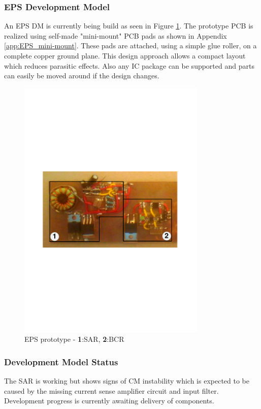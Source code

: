 \subsubsection{EPS Development Model}
An \ac{EPS} \ac{DM} is currently being build as seen in Figure \ref{fig:EPSprototype}. The prototype \ac{PCB} is realized using self-made "mini-mount" \ac{PCB} pads as shown in Appendix \ref{app:EPS_mini-mount}. These pads are attached, using a simple glue roller, on a complete copper ground plane. This design approach allows a compact layout which reduces parasitic effects. Also any \ac{IC} package can be supported and parts can easily be moved around if the design changes.
%
\begin{figure}[H]
\centering
\includegraphics[width=0.8\textwidth]{figures/fig_CDR_EPSprototype}
\caption{\ac{EPS} prototype - \textbf{1}:\ac{SAR}, \textbf{2}:\ac{BCR}}
\label{fig:EPSprototype}
\end{figure}
%
\subsubsection*{Development Model Status}
The \ac{SAR} is working but shows signs of \ac{CM} instability which is expected to be caused by the missing current sense amplifier circuit and input filter. Development progress is currently awaiting delivery of components.

